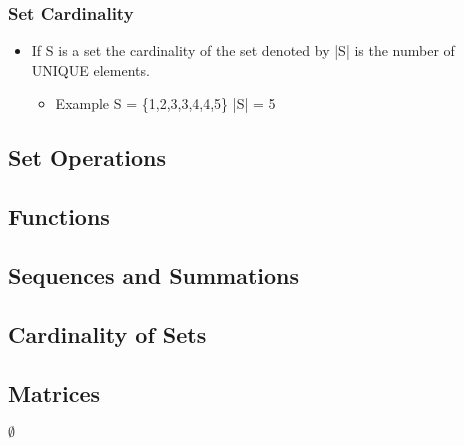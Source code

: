 \documentclass[11pt]{article}
\begin{document}
\subsubsection{Set Cardinality}
\label{sec-2-1-7}
\begin{itemize}

\item If S is a set the cardinality of the set denoted by |S| is the number of UNIQUE elements.
\label{sec-2-1-7-1}%
\begin{itemize}

\item Example S = \{1,2,3,3,4,4,5\} |S| = 5
\label{sec-2-1-7-1-1}%
\end{itemize} %
\end{itemize} %
\subsection{Set Operations}
\label{sec-2-2}
\subsection{Functions}
\label{sec-2-3}
\subsection{Sequences and Summations}
\label{sec-2-4}
\subsection{Cardinality of Sets}
\label{sec-2-5}
\subsection{Matrices}
\label{sec-2-6}




$\emptyset$
\end{document}
